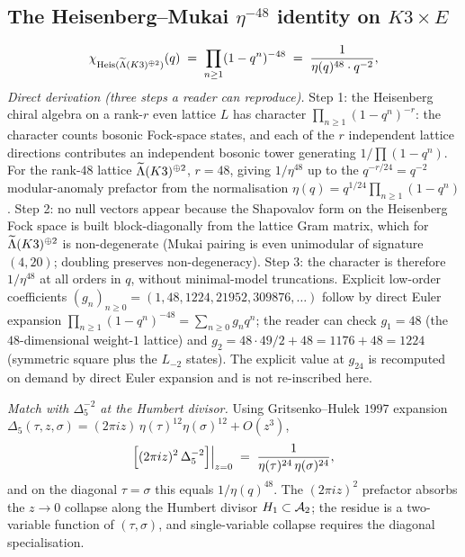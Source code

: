 \subsection{The Heisenberg--Mukai $\eta^{-48}$ identity on $K3\times E$}
\label{wn:subsec:spine-heis-mukai}

\begin{theorem}
\label{wn:thm:spine-heis-mukai}
\[
\chi_{\mathrm{Heis}(\widetilde{\Lambda}(K3)^{\oplus 2})}(q) \;=\;
\prod_{n \geq 1}(1 - q^n)^{-48}
\;=\; \frac{1}{\eta(q)^{48} \cdot q^{-2}},
\]
\emph{Direct derivation (three steps a reader can reproduce).}
Step 1: the Heisenberg chiral algebra on a rank-$r$ even lattice $L$
has character $\prod_{n \ge 1}(1 - q^n)^{-r}$: the character counts
bosonic Fock-space states, and each of the $r$ independent lattice
directions contributes an independent bosonic tower generating
$1/\prod(1 - q^n)$. For the rank-$48$ lattice $\widetilde{\Lambda}(K3)^{\oplus 2}$,
$r = 48$, giving $1/\eta^{48}$ up to the $q^{-r/24} = q^{-2}$
modular-anomaly prefactor from the normalisation
$\eta(q) = q^{1/24}\prod_{n\ge 1}(1 - q^n)$.
Step 2: no null vectors appear because the Shapovalov form on the
Heisenberg Fock space is built block-diagonally from the lattice
Gram matrix, which for $\widetilde{\Lambda}(K3)^{\oplus 2}$ is non-degenerate
(Mukai pairing is even unimodular of signature $(4, 20)$; doubling
preserves non-degeneracy). Step 3: the character is therefore
$1/\eta^{48}$ at all orders in $q$, without minimal-model truncations.
Explicit low-order coefficients
$(g_n)_{n \geq 0} = (1, 48, 1224, 21952, 309876, \dots)$ follow by
direct Euler expansion $\prod_{n\ge 1}(1 - q^n)^{-48}
= \sum_{n \ge 0} g_n q^n$; the reader can check $g_1 = 48$ (the
$48$-dimensional weight-$1$ lattice) and $g_2 = 48 \cdot 49/2 + 48
= 1176 + 48 = 1224$ (symmetric square plus the $L_{-2}$ states).
The explicit value at $g_{24}$ is recomputed on demand by direct
Euler expansion and is not re-inscribed here.

\emph{Match with $\Delta_5^{-2}$ at the Humbert divisor.} Using
Gritsenko--Hulek $1997$ expansion
$\Delta_5(\tau, z, \sigma) = (2\pi i z)\,\eta(\tau)^{12}\eta(\sigma)^{12}
+ O(z^3)$,
\[
\Bigl[(2\pi i z)^2\, \Delta_5^{-2}\Bigr]\Big|_{z = 0}
\;=\; \frac{1}{\eta(\tau)^{24}\,\eta(\sigma)^{24}},
\]
and on the diagonal $\tau = \sigma$ this equals $1/\eta(q)^{48}$. The
$(2\pi i z)^2$ prefactor absorbs the $z \to 0$ collapse along the
Humbert divisor $H_1 \subset \mathcal{A}_2$; the residue is a two-variable
function of $(\tau, \sigma)$, and single-variable collapse requires
the diagonal specialisation.


\end{theorem}

